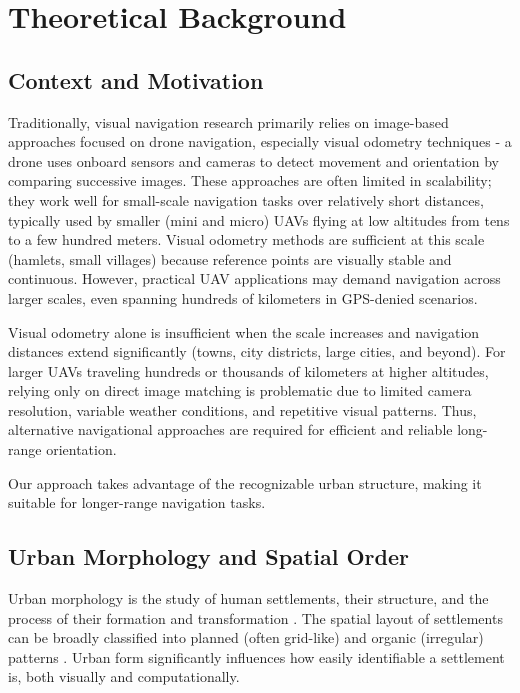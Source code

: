 \chapter{Theoretical Background}

\section{Context and Motivation}

Traditionally, visual navigation research primarily relies on image-based approaches focused on drone navigation, especially visual odometry techniques - a drone uses onboard sensors and cameras to detect movement and orientation by comparing successive images. These approaches are often limited in scalability; they work well for small-scale navigation tasks over relatively short distances, typically used by smaller (mini and micro) UAVs flying at low altitudes from tens to a few hundred meters. Visual odometry methods are sufficient at this scale (hamlets, small villages) because reference points are visually stable and continuous. However, practical UAV applications may demand navigation across larger scales, even spanning hundreds of kilometers in GPS-denied scenarios.

Visual odometry alone is insufficient when the scale increases and navigation distances extend significantly (towns, city districts, large cities, and beyond). For larger UAVs traveling hundreds or thousands of kilometers at higher altitudes, relying only on direct image matching is problematic due to limited camera resolution, variable weather conditions, and repetitive visual patterns. Thus, alternative navigational approaches are required for efficient and reliable long-range orientation.

Our approach takes advantage of the recognizable urban structure, making it suitable for longer-range navigation tasks.

\section{Urban Morphology and Spatial Order}

Urban morphology is the study of human settlements, their structure, and the process of their formation and transformation \cite{Kropf_2017}. The spatial layout of settlements can be broadly classified into planned (often grid-like) and organic (irregular) patterns \cite{smith2007}. Urban form significantly influences how easily identifiable a settlement is, both visually and computationally.

